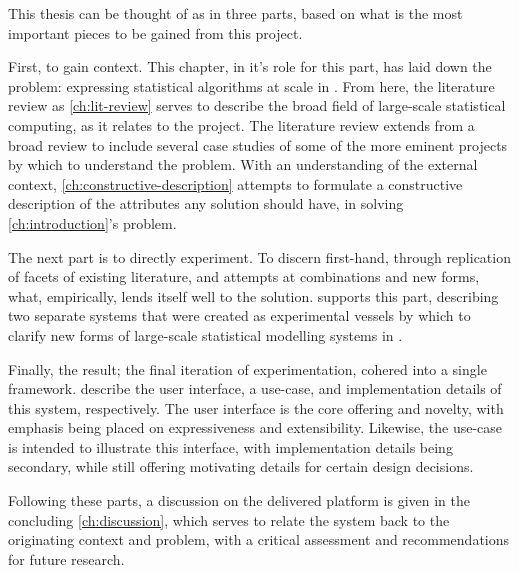 This thesis can be thought of as in three parts, based on what is the most important pieces to be gained from this project.

First, to gain context.
This chapter, in it's role for this part, has laid down the problem: expressing statistical algorithms at scale in \R{}.
From here, the literature review as \cref{ch:lit-review} serves to describe the broad field of large-scale statistical computing, as it relates to the \lsr{} project.
The literature review extends from a broad review to include several case studies of some of the more eminent projects by which to understand the problem.
With an understanding of the external context, \cref{ch:constructive-description} attempts to formulate a constructive description of the attributes any solution should have, in solving \cref{ch:introduction}'s problem.

The next part is to directly experiment.
To discern first-hand, through replication of facets of existing literature, and attempts at combinations and new forms, what, empirically, lends itself well to the solution.
 supports this part, describing two separate systems that were created as experimental vessels by which to clarify new forms of large-scale statistical modelling systems in \R{}.

Finally, the result; the final iteration of experimentation, cohered into a single \lsr{} framework.
 describe the user interface, a use-case, and implementation details of this system, respectively.
The user interface is the core offering and novelty, with emphasis being placed on expressiveness and extensibility.
Likewise, the use-case is intended to illustrate this interface, with implementation details being secondary, while still offering motivating details for certain design decisions.

Following these parts, a discussion on the delivered platform is given in the concluding \cref{ch:discussion}, which serves to relate the \lsr{} system back to the originating context and problem, with a critical assessment and recommendations for future research.

